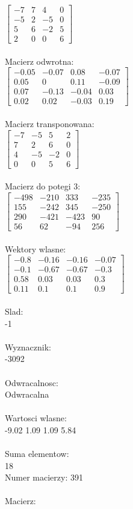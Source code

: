 \documentclass[a4paper,12pt]{article}
\begin{document}
$\begin{bmatrix} -7&7&4&0\\-5&2&-5&0\\5&6&-2&5\\2&0&0&6 \end{bmatrix}$
\\
\\
Macierz odwrotna:\\

$\begin{bmatrix} -0.05&-0.07&0.08&-0.07\\0.05&0&0.11&-0.09\\0.07&-0.13&-0.04&0.03\\0.02&0.02&-0.03&0.19 \end{bmatrix}$
\\
\\
Macierz transponowana:\\

$\begin{bmatrix} -7&-5&5&2\\7&2&6&0\\4&-5&-2&0\\0&0&5&6 \end{bmatrix}$
\\
\\
Macierz do potegi 3:\\

$\begin{bmatrix} -498&-210&333&-235\\155&-242&345&-250\\290&-421&-423&90\\56&62&-94&256 \end{bmatrix}$
\\
\\
Wektory wlasne:\\

$\begin{bmatrix} -0.8&-0.16&-0.16&-0.07\\-0.1&-0.67&-0.67&-0.3\\0.58&0.03&0.03&0.3\\0.11&0.1&0.1&0.9 \end{bmatrix}$
\\
\\
Slad:\\
-1
\\
\\
Wyznacznik:\\
-3092
\\
\\
Odwracalnosc:\\
Odwracalna
\\
\\
Wartosci wlasne:\\
-9.02 1.09 1.09 5.84
\\
\\
Suma elementow:\\
18
\\
\newpage
Numer macierzy:
391
\\
\\
Macierz:\\
\end{document}
